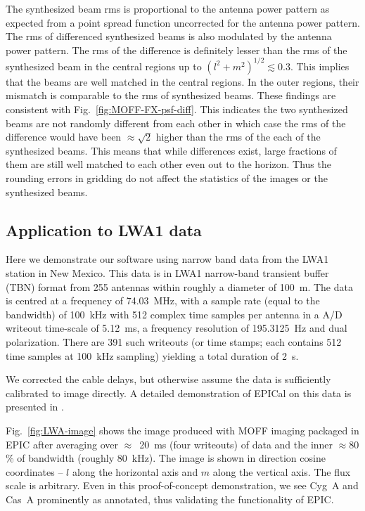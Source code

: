 \documentclass[a4paper,fleqn,usenatbib]{mnras}
\begin{document}
The synthesized beam rms is proportional to the antenna power pattern as expected from a point spread function uncorrected for the antenna power pattern. The rms of differenced synthesized beams is also modulated by the antenna power pattern. The rms of the difference is definitely lesser than the rms of the synthesized beam in the central regions up to $(l^2+m^2)^{1/2}\lesssim 0.3$. This implies that the beams are well matched in the central regions. In the outer regions, their mismatch is comparable to the rms of synthesized beams. These findings are consistent with Fig.~\ref{fig:MOFF-FX-psf-diff}. This indicates the two synthesized beams are not randomly different from each other in which case the rms of the difference would have been $\approx \sqrt{2}$ higher than the rms of the each of the synthesized beams. This means that while differences exist, large fractions of them are still well matched to each other even out to the horizon. Thus the rounding errors in gridding do not affect the statistics of the images or the synthesized beams.

\subsection{Application to LWA1 data}\label{sec:LWA-data}

Here we demonstrate our software using narrow band data from the LWA1 station in New Mexico. This data is in LWA1 narrow-band transient buffer (TBN) format from 255 antennas within roughly a diameter of 100~m. The data is centred at a frequency of 74.03~MHz, with a sample rate (equal to the bandwidth) of 100~kHz with 512 complex time samples per antenna in a A/D writeout time-scale of 5.12~ms, a frequency resolution of 195.3125~Hz and dual polarization. There are 391 such writeouts (or time stamps; each contains 512 time samples at 100~kHz sampling) yielding a total duration of 2~s. 

We corrected the cable delays, but otherwise assume the data is sufficiently calibrated to image directly. A detailed demonstration of EPICal on this data is presented in \citet{bea16}.

Fig.~\ref{fig:LWA-image} shows the image produced with MOFF imaging packaged in EPIC after averaging over $\approx$~20~ms (four writeouts) of data and the inner $\approx 80$\% of bandwidth (roughly 80~kHz). The image is shown in direction cosine coordinates -- $l$ along the horizontal axis and $m$ along the vertical axis. The flux scale is arbitrary. Even in this proof-of-concept demonstration, we see Cyg~A and Cas~A prominently as annotated, thus validating the functionality of EPIC.
\end{document}
